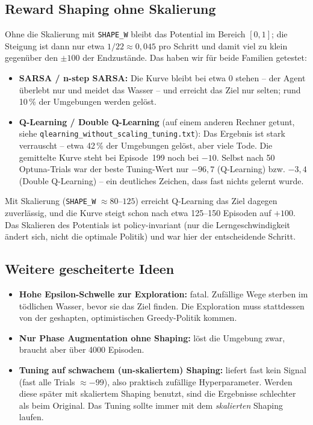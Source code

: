 \documentclass[11pt,a4paper]{article}
\begin{document}
\subsection{Reward Shaping ohne Skalierung}
Ohne die Skalierung mit \texttt{SHAPE\_W} bleibt das Potential im Bereich $[0,1]$; die
Steigung ist dann nur etwa $1/22 \approx 0{,}045$ pro Schritt und damit viel zu klein
gegen\"uber den $\pm100$ der Endzust\"ande. Das haben wir f\"ur beide Familien
getestet:
\begin{itemize}
  \item \textbf{SARSA / n-step SARSA:} Die Kurve bleibt bei etwa $0$ stehen -- der
        Agent \glqq \"uberlebt\grqq{} nur und meidet das Wasser -- und erreicht das
        Ziel nur selten; rund 10\,\% der Umgebungen werden gel\"ost.
  \item \textbf{Q-Learning / Double Q-Learning} (auf einem anderen Rechner getunt,
        siehe \texttt{qlearning\_without\_scaling\_tuning.txt}): Das Ergebnis ist stark
        verrauscht -- etwa 42\,\% der Umgebungen gel\"ost, aber viele Tode. Die
        gemittelte Kurve steht bei Episode~199 noch bei $-10$. Selbst nach 50
        Optuna-Trials war der beste Tuning-Wert nur $-96{,}7$ (Q-Learning) bzw.
        $-3{,}4$ (Double Q-Learning) -- ein deutliches Zeichen, dass fast nichts gelernt
        wurde.
\end{itemize}
Mit Skalierung (\texttt{SHAPE\_W} $\approx 80$--$125$) erreicht Q-Learning das Ziel
dagegen zuverl\"assig, und die Kurve steigt schon nach etwa 125--150 Episoden auf
$+100$. Das Skalieren des Potentials ist policy-invariant (nur die Lerngeschwindigkeit
\"andert sich, nicht die optimale Politik) und war hier der entscheidende Schritt.

\subsection{Weitere gescheiterte Ideen}
\begin{itemize}
  \item \textbf{Hohe Epsilon-Schwelle zur Exploration:} fatal. Zuf\"allige Wege sterben
        im t\"odlichen Wasser, bevor sie das Ziel finden. Die Exploration muss
        stattdessen von der geshapten, optimistischen Greedy-Politik kommen.
  \item \textbf{Nur Phase Augmentation ohne Shaping:} l\"ost die Umgebung zwar, braucht
        aber \"uber 4000 Episoden.
  \item \textbf{Tuning auf schwachem (un-skaliertem) Shaping:} liefert fast kein Signal
        (fast alle Trials $\approx -99$), also praktisch zuf\"allige Hyperparameter.
        Werden diese sp\"ater mit skaliertem Shaping benutzt, sind die Ergebnisse
        schlechter als beim Original. Das Tuning sollte immer mit dem \emph{skalierten}
        Shaping laufen.
\end{itemize}
\end{document}
